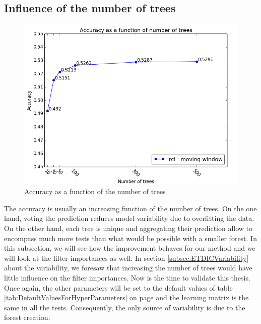 \documentclass[a4paper]{report}
\begin{document}
		\subsection{Influence of the number of trees}
		\begin{figure}
			\centering
				\includegraphics[width=1.0\textwidth]{images/accFnbTrees.png}
			\caption{\label{fig:accFnbTrees}Accuracy as a function of the number of trees}
		\end{figure}
		The accuracy is usually an increasing function of the number of trees. On the one hand, voting the prediction reduces model variability due to overfitting the data. On the other hand, each tree is unique and aggregating their prediction allow to encompass much more tests than what would be possible with a smaller forest. In this subsection, we will see how the improvement behaves for our method and we will look at the filter importances as well. In section \ref{subsec:ETDICVariability} about the variability, we foresaw that increasing the number of trees would have little influence on the filter importances. Now is the time to validate this thesis. Once again, the other parameters will be set to the default values of table \ref{tab:DefaultValuesForHyperParameters} on page \pageref{tab:DefaultValuesForHyperParameters} and the learning matrix is the same in all the tests. Consequently, the only source of variability is due to the forest creation.
\end{document}
